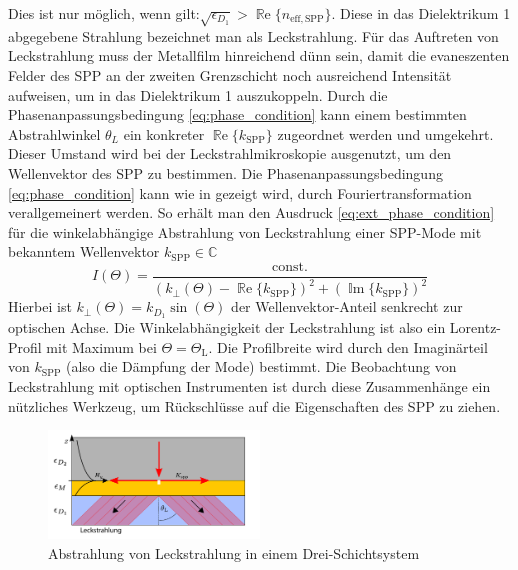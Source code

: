 \documentclass[titlepage]{article}
\renewcommand{\Re}{\operatorname{\mathbb{R}e}}
\renewcommand{\Im}{\operatorname{\mathbb{I}m}}
\begin{document}
	Dies ist nur möglich, wenn gilt:{$\sqrt{\epsilon_{D_1}} > \Re\{n_\mathrm{eff, SPP}\}$}. Diese in das Dielektrikum 1 abgegebene Strahlung bezeichnet man als Leckstrahlung. Für das Auftreten von Leckstrahlung muss der Metallfilm hinreichend dünn sein, damit die evaneszenten Felder des  SPP an der zweiten Grenzschicht noch ausreichend Intensität aufweisen, um in das Dielektrikum 1 auszukoppeln. Durch die Phasenanpassungsbedingung \eqref{eq:phase_condition} kann einem bestimmten Abstrahlwinkel $\theta_L$ ein konkreter $\Re\{k_{\mathrm{SPP}}\}$ zugeordnet werden und umgekehrt. Dieser Umstand wird bei der Leckstrahlmikroskopie ausgenutzt, um den Wellenvektor des SPP zu bestimmen.
	Die Phasenanpassungsbedingung \eqref{eq:phase_condition} kann  wie in \cite{Burke.1986} gezeigt wird, durch Fouriertransformation verallgemeinert werden. So erhält man den Ausdruck \eqref{eq:ext_phase_condition} für die winkelabhängige Abstrahlung von Leckstrahlung einer SPP-Mode mit bekanntem Wellenvektor $k_{\mathrm{SPP}} \in \mathbb{C}$
	\begin{equation}
		\label{eq:ext_phase_condition}
		I(\Theta) = \dfrac{\text{const.}}{\left(k_{\perp}(\Theta) - \Re\{k_{\mathrm{SPP}}\}\right)^2 + (\Im\{k_{\mathrm{SPP}}\})^2}
	\end{equation}
	Hierbei ist $k_{\perp}(\Theta) = k_{D_1}\sin(\Theta)$ der Wellenvektor-Anteil senkrecht zur optischen Achse. Die Winkelabhängigkeit der Leckstrahlung ist also ein Lorentz-Profil mit Maximum bei $\Theta = \Theta_\mathrm{L}$. Die Profilbreite wird durch den Imaginärteil von $k_{\mathrm{SPP}}$ (also die Dämpfung der Mode) bestimmt. Die Beobachtung von Leckstrahlung mit optischen Instrumenten ist durch diese Zusammenhänge ein nützliches Werkzeug, um Rückschlüsse auf die Eigenschaften des SPP zu ziehen.
	\begin{figure}[h] 
		\centering
		\includegraphics[width=0.5\textwidth]{figures/leckstrahlung.pdf}
		\caption{Abstrahlung von Leckstrahlung in einem Drei-Schichtsystem}
		\label{fig:leakage_radiation}
	\end{figure}
\end{document}
